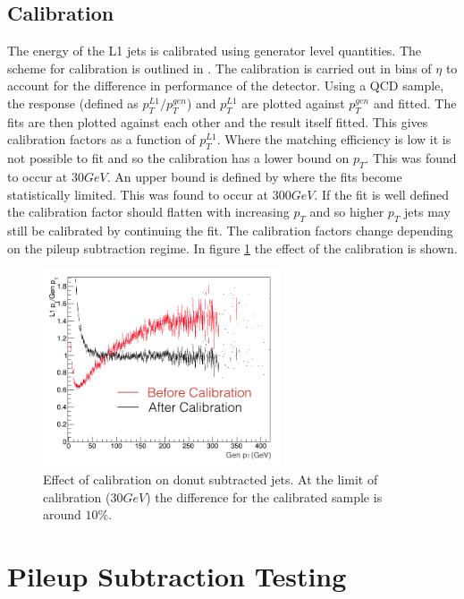 \subsection{Calibration}
The energy of the L1 jets is calibrated using generator level quantities. The scheme for calibration is outlined in \cite{l1jet_calibration}. The calibration is carried out in bins of $\eta$ to account for the difference in performance of the detector. Using a QCD sample, the response (defined as $p^{L1}_{T}/p^{gen}_{T}$) and $p^{L1}_{T}$ are plotted against $p^{gen}_{T}$ and fitted. The fits are then plotted against each other and the result itself fitted. This gives calibration factors as a function of $p^{L1}_{T}$.  Where the matching efficiency is low it is not possible to fit and so the calibration has a lower bound on $p_T$. This was found to occur at $30GeV$. An upper bound is defined by where the fits become statistically limited. This was found to occur at $300GeV$. If the fit is well defined the calibration factor should flatten with increasing $p_T$ and so higher $p_T$ jets may still be calibrated by continuing the fit. The calibration factors change depending on the pileup subtraction regime. In figure \ref{calib} the effect of the calibration is shown.   

\begin{figure}
\centering
    \includegraphics[width=7cm]{./Figures/calibration}
  \caption{Effect of calibration on donut subtracted jets. At the limit of calibration ($30GeV$) the difference for the calibrated sample is around $10\%$.}
  \label{calib}
\end{figure}
\section{Pileup Subtraction Testing}

